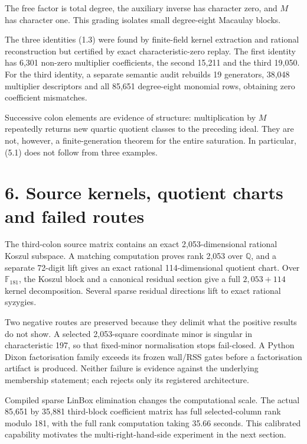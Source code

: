 \documentclass[
  11pt,
]{article}
\begin{document}
The free factor is total degree, the auxiliary inverse has character
zero, and \(M\) has character one. This grading isolates small
degree-eight Macaulay blocks.

The three identities (1.3) were found by finite-field kernel extraction
and rational reconstruction but certified by exact characteristic-zero
replay. The first identity has 6,301 non-zero multiplier coefficients,
the second 15,211 and the third 19,050. For the third identity, a
separate semantic audit rebuilds 19 generators, 38,048 multiplier
descriptors and all 85,651 degree-eight monomial rows, obtaining zero
coefficient mismatches.

Successive colon elements are evidence of structure: multiplication by
\(M\) repeatedly returns new quartic quotient classes to the preceding
ideal. They are not, however, a finite-generation theorem for the entire
saturation. In particular, (5.1) does not follow from three examples.

\section{6. Source kernels, quotient charts and failed
routes}\label{source-kernels-quotient-charts-and-failed-routes}

The third-colon source matrix contains an exact 2,053-dimensional
rational Koszul subspace. A matching computation proves rank 2,053 over
\(\mathbb Q\), and a separate 72-digit lift gives an exact rational
114-dimensional quotient chart. Over \(\mathbb F_{181}\), the Koszul
block and a canonical residual section give a full \(2,053+114\) kernel
decomposition. Several sparse residual directions lift to exact rational
syzygies.

Two negative routes are preserved because they delimit what the positive
results do not show. A selected 2,053-square coordinate minor is
singular in characteristic 197, so that fixed-minor normalisation stops
fail-closed. A Python Dixon factorisation family exceeds its frozen
wall/RSS gates before a factorisation artifact is produced. Neither
failure is evidence against the underlying membership statement; each
rejects only its registered architecture.

Compiled sparse LinBox elimination changes the computational scale. The
actual 85,651 by 35,881 third-block coefficient matrix has full
selected-column rank modulo 181, with the full rank computation taking
35.66 seconds. This calibrated capability motivates the
multi-right-hand-side experiment in the next section.
\end{document}
